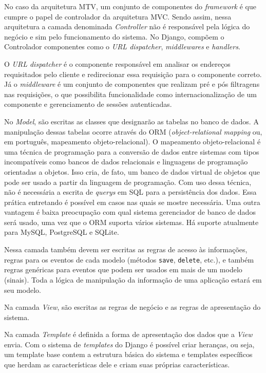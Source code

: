     No caso da arquitetura MTV, um conjunto de componentes do \textit{framework} é que cumpre o papel de controlador da arquitetura MVC. Sendo assim, nessa arquitetura a camada denominada \textit{Controller} não é responsável pela lógica do negócio e sim pelo funcionamento do sistema. No Django, compõem o Controlador componentes como o \textit{URL dispatcher}, \textit{middlewares} e \textit{handlers}.

    O \textit{URL dispatcher} é o componente responsável em analisar os endereços requisitados pelo cliente e redirecionar essa requisição para o componente correto. Já o \textit{middleware} é um conjunto de componentes que realizam pré e pós filtragens nas requisições, o que possibilita funcionalidade como internacionalização de um componente e gerenciamento de sessões autenticadas.

    No \textit{Model}, são escritas as classes que designarão as tabelas no banco de dados. A manipulação dessas tabelas ocorre através do ORM (\textit{object-relational mapping} ou, em português, mapeamento objeto-relacional). O mapeamento objeto-relacional é uma técnica de programação para a conversão de dados entre sistemas com tipos incompatíveis como bancos de dados relacionais e linguagens de programação orientadas a objetos. Isso cria, de fato, um banco de dados virtual de objetos que pode ser usado a partir da linguagem de programação. Com uso dessa técnica, não é necessária a escrita de \textit{querys} em SQL para a persistência dos dados. Essa prática entretando é possível em casos nas quais se mostre necessária. Uma outra vantagem é baixa preocupação com qual sistema gerenciador de banco de dados será usado, uma vez que o ORM suporta vários sistemas. Há suporte atualmente para MySQL, PostgreSQL e SQLite.

    Nessa camada também devem ser escritas as regras de acesso às informações, regras para os eventos de cada modelo (métodos \texttt{save}, \texttt{delete}, etc.), e também regras genéricas para eventos que podem ser usados em mais de um modelo (sinais). Toda a lógica de manipulação da informação de uma aplicação estará em seu modelo.

    Na camada \textit{View}, são escritas as regras de negócio e as regras de apresentação do sistema.

    Na camada \textit{Template} é definida a forma de apresentação dos dados que a \textit{View} envia. Com o sistema de \textit{templates} do Django é possível criar heranças, ou seja, um template base contem a estrutura básica do sistema e templates específicos que herdam as características dele e criam suas próprias características.

